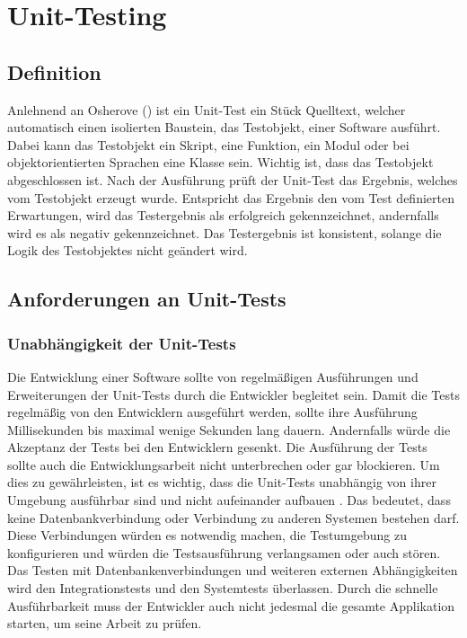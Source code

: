 \section{Unit-Testing}
\subsection{Definition}
Anlehnend an Osherove (\citeyear[S. 34]{Osherove2015}) ist ein \gls{Unit-Test} ein Stück Quelltext, welcher automatisch einen isolierten Baustein, das Testobjekt, einer Software ausführt. Dabei kann das Testobjekt ein Skript, eine Funktion, ein Modul oder bei objektorientierten Sprachen eine Klasse sein. Wichtig ist, dass das Testobjekt abgeschlossen ist. Nach der Ausführung prüft der Unit-Test das Ergebnis, welches vom Testobjekt erzeugt wurde. Entspricht das Ergebnis den vom Test definierten Erwartungen, wird das Testergebnis als erfolgreich gekennzeichnet, andernfalls wird es als negativ gekennzeichnet.
Das Testergebnis ist konsistent, solange die Logik des Testobjektes nicht geändert wird.

\subsection{Anforderungen an Unit-Tests}
\subsubsection*{Unabhängigkeit der Unit-Tests}
Die Entwicklung einer Software sollte von regelmäßigen Ausführungen und Erweiterungen der Unit-Tests durch die Entwickler begleitet sein. Damit die Tests regelmäßig von den Entwicklern ausgeführt werden, sollte ihre Ausführung Millisekunden bis maximal wenige Sekunden lang dauern. Andernfalls würde die Akzeptanz der Tests bei den Entwicklern gesenkt. Die Ausführung der Tests sollte auch die Entwicklungsarbeit nicht unterbrechen oder gar blockieren. Um dies zu gewährleisten, ist es wichtig, dass die Unit-Tests unabhängig von ihrer Umgebung ausführbar sind und nicht aufeinander aufbauen \autocite[vgl.][S. 19]{Springer2015}. Das bedeutet, dass keine Datenbankverbindung oder Verbindung zu anderen Systemen bestehen darf. Diese Verbindungen würden es notwendig machen, die Testumgebung zu konfigurieren und würden die Testsausführung verlangsamen oder auch stören. Das Testen mit Datenbankenverbindungen und weiteren externen Abhängigkeiten wird den Integrationstests und den Systemtests überlassen.
Durch die schnelle Ausführbarkeit muss der Entwickler auch nicht jedesmal die gesamte Applikation starten, um seine Arbeit zu prüfen.
